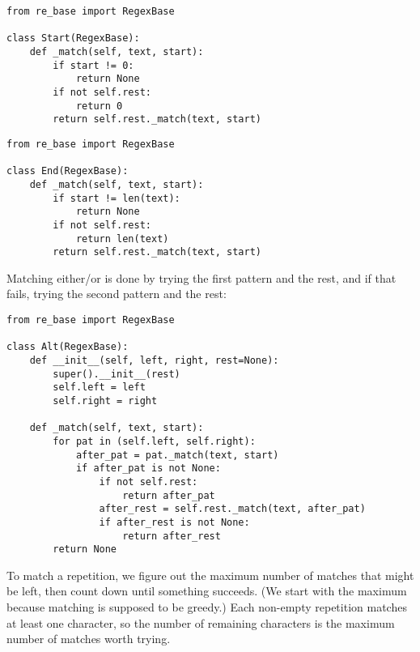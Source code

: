 \documentclass{scrbook}
\begin{document}
\begin{lstlisting}[frame=single,frameround=tttt]
from re_base import RegexBase

class Start(RegexBase):
    def _match(self, text, start):
        if start != 0:
            return None
        if not self.rest:
            return 0
        return self.rest._match(text, start)
\end{lstlisting}



\begin{lstlisting}[frame=single,frameround=tttt]
from re_base import RegexBase

class End(RegexBase):
    def _match(self, text, start):
        if start != len(text):
            return None
        if not self.rest:
            return len(text)
        return self.rest._match(text, start)
\end{lstlisting}



Matching either/or is done by trying the first pattern and the rest,
and if that fails,
trying the second pattern and the rest:


\begin{lstlisting}[frame=single,frameround=tttt]
from re_base import RegexBase

class Alt(RegexBase):
    def __init__(self, left, right, rest=None):
        super().__init__(rest)
        self.left = left
        self.right = right

    def _match(self, text, start):
        for pat in (self.left, self.right):
            after_pat = pat._match(text, start)
            if after_pat is not None:
                if not self.rest:
                    return after_pat
                after_rest = self.rest._match(text, after_pat)
                if after_rest is not None:
                    return after_rest
        return None
\end{lstlisting}



To match a repetition,
we figure out the maximum number of matches that might be left,
then count down until something succeeds.
(We start with the maximum because matching is supposed to be greedy.)
Each non-empty repetition matches at least one character,
so the number of remaining characters is the maximum number of matches worth trying.
\end{document}
